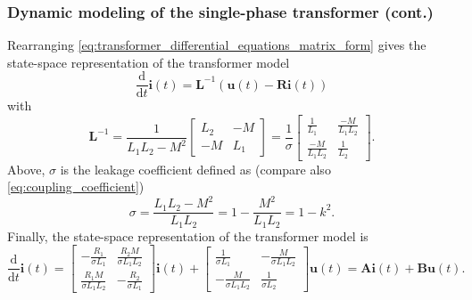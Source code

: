 \begin{frame}
	\frametitle{Dynamic modeling of the single-phase transformer (cont.)}
		Rearranging \eqref{eq:transformer_differential_equations_matrix_form} gives the state-space representation of the transformer model
		\begin{equation}
			\frac{\mathrm{d}}{\mathrm{d}t}\bm{i}(t) = \bm{L}^{-1}\left(\bm{u}(t)-\bm{R}\bm{i}(t) \right)
			\label{eq:transformer_state_space_01}
		\end{equation}
		with
		$$ \renewcommand*{\arraystretch}{1.3} \bm{L}^{-1} = \frac{1}{L_1L_2 - M^2} \begin{bmatrix} L_2 & -M \\ -M & L_1 \end{bmatrix} = \frac{1}{\sigma} \begin{bmatrix} \frac{1}{L_1} &  \frac{-M}{L_1 L_2} \\ \frac{-M}{L_1 L_2} & \frac{1}{L_2} \end{bmatrix}.$$
		Above, $\sigma$ is the leakage coefficient defined as (compare also \eqref{eq:coupling_coefficient})
		\begin{equation}
			\sigma = \frac{L_1 L_2 -M^2}{L_1 L_2 } = 1 - \frac{M^2}{ L_1 L_2} = 1 - k^2 .
		\end{equation}
		Finally, the state-space representation of the transformer model is
		\begin{equation}
			\renewcommand*{\arraystretch}{1.3} 
			\frac{\mathrm{d}}{\mathrm{d}t}\bm{i}(t) = \begin{bmatrix} -\frac{R_1}{\sigma L_1} & \frac{R_2 M}{\sigma L_1 L_2} \\ \frac{R_1 M}{\sigma L_1 L_2} & -\frac{R_2}{\sigma L_1} \end{bmatrix} \bm{i}(t) + \begin{bmatrix} \frac{1}{\sigma L_1} & -\frac{M}{\sigma L_1 L_2} \\ -\frac{M}{\sigma L_1 L_2} & \frac{1}{\sigma L_2} \end{bmatrix} \bm{u}(t) = \bm{A} \bm{i}(t) + \bm{B} \bm{u}(t) .	 
			\label{eq:transformer_state_space_02}
		\end{equation}
\end{frame}

